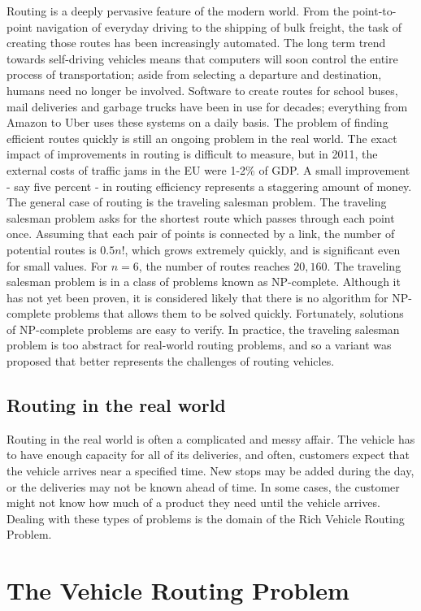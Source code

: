 \documentclass{sig-alternate}
\begin{document}
Routing is a deeply pervasive feature of the modern world. From the point-to-point navigation of everyday driving to the shipping of bulk freight, the task of creating those routes has been increasingly automated. The long term trend towards self-driving vehicles means that computers will soon control the entire process of transportation; aside from selecting a departure and destination, humans need no longer be involved. Software to create routes for school buses, mail deliveries and garbage trucks have been in use for decades; everything from Amazon to Uber uses these systems on a daily basis. The problem of finding efficient routes quickly is still an ongoing problem in the real world. The exact impact of improvements in routing is difficult to measure, but in 2011, the external costs of traffic jams in the EU were 1-2\% of GDP\cite{Caceres-Cruz:2014}. A small improvement - say five percent - in routing efficiency represents a staggering amount of money. The general case of routing is the traveling salesman problem. The traveling salesman problem asks for the shortest route which passes through each point once. Assuming that each pair of points is connected by a link, the number of potential routes is $0.5n!$, which grows extremely quickly, and is significant even for small values. For $n=6$, the number of routes reaches $20,160$. The traveling salesman problem is in a class of problems known as NP-complete. Although it has not yet been proven, it is considered likely that there is no algorithm for NP-complete problems that allows them to be solved quickly. Fortunately, solutions of NP-complete problems are easy to verify. In practice, the traveling salesman problem is too abstract for real-world routing problems, and so a variant was proposed that better represents the challenges of routing vehicles.

\subsection{Routing in the real world}
\label{ssec:real}
Routing in the real world is often a complicated and messy affair. The vehicle has to have enough capacity for all of its deliveries, and often, customers expect that the vehicle arrives near a specified time. New stops may be added during the day, or the deliveries may not be known ahead of time. In some cases, the customer might not know how much of a product they need until the vehicle arrives. Dealing with these types of problems is the domain of the Rich Vehicle Routing Problem.
\section{The Vehicle Routing Problem}
\label{sec:VRP}
\end{document}
